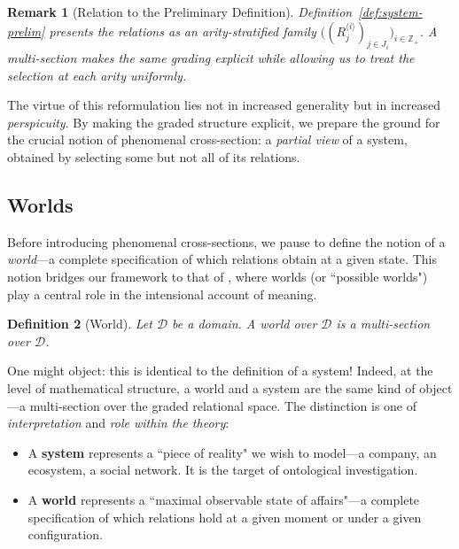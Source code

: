 \documentclass[12pt,a4paper]{article}
\newtheorem{definition}{Definition}[section]
\newtheorem{remark}[definition]{Remark}
\newcommand{\domain}{\mathcal{D}}
\begin{document}
\begin{remark}[Relation to the Preliminary Definition]
Definition~\ref{def:system-prelim} presents the relations as an arity-stratified family $\big((R^{\langle i \rangle}_j)_{j\in J_i}\big)_{i\in \mathbb{Z}_+}$. A multi-section makes the same grading explicit while allowing us to treat the selection at each arity uniformly.
\end{remark}

The virtue of this reformulation lies not in increased generality but in increased \emph{perspicuity}. By making the graded structure explicit, we prepare the ground for the crucial notion of phenomenal cross-section: a \emph{partial view} of a system, obtained by selecting some but not all of its relations.

\subsection{Worlds}

Before introducing phenomenal cross-sections, we pause to define the notion of a \emph{world}---a complete specification of which relations obtain at a given state. This notion bridges our framework to that of \citet{guarino2009}, where worlds (or ``possible worlds") play a central role in the intensional account of meaning.

\begin{definition}[World]
\label{def:world}
Let $\domain$ be a domain. A \emph{world} over $\domain$ is a multi-section over $\domain$.
\end{definition}

One might object: this is identical to the definition of a system! Indeed, at the level of mathematical structure, a world and a system are the same kind of object---a multi-section over the graded relational space. The distinction is one of \emph{interpretation} and \emph{role within the theory}:

\begin{itemize}
    \item A \textbf{system} represents a ``piece of reality" we wish to model---a company, an ecosystem, a social network. It is the target of ontological investigation.
    \item A \textbf{world} represents a ``maximal observable state of affairs"---a complete specification of which relations hold at a given moment or under a given configuration.
\end{itemize}
\end{document}
